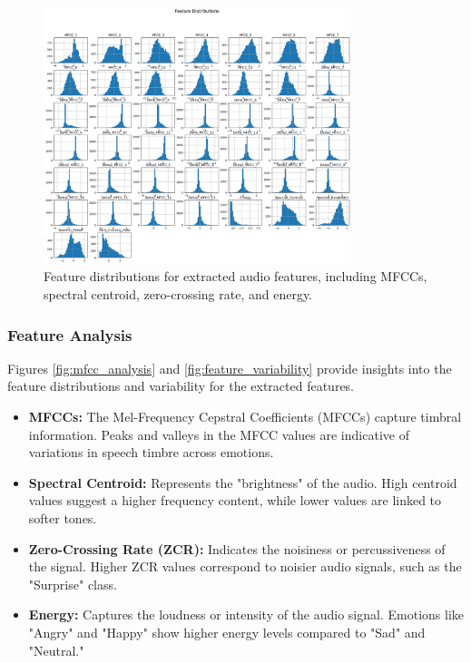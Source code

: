 \documentclass{article}
\begin{document}
\begin{figure}[!h]
    \centering
    \includegraphics[width=0.8\textwidth]{../assets/feature_distributions.png}
    \caption{Feature distributions for extracted audio features, including MFCCs, spectral centroid, zero-crossing rate, 
    and energy.}
    \label{fig:feature_distributions}
\end{figure}

\subsubsection*{Feature Analysis}

Figures \ref{fig:mfcc_analysis} and \ref{fig:feature_variability} provide insights into the feature distributions and 
variability for the extracted features.

\begin{itemize}
    \item \textbf{MFCCs:} The Mel-Frequency Cepstral Coefficients (MFCCs) capture timbral information. Peaks and valleys 
    in the MFCC values are indicative of variations in speech timbre across emotions.
    \item \textbf{Spectral Centroid:} Represents the "brightness" of the audio. High centroid values suggest a higher 
    frequency content, while lower values are linked to softer tones.
    \item \textbf{Zero-Crossing Rate (ZCR):} Indicates the noisiness or percussiveness of the signal. Higher ZCR values 
    correspond to noisier audio signals, such as the "Surprise" class.
    \item \textbf{Energy:} Captures the loudness or intensity of the audio signal. Emotions like "Angry" and "Happy" show 
    higher energy levels compared to "Sad" and "Neutral."
\end{itemize}
\end{document}
